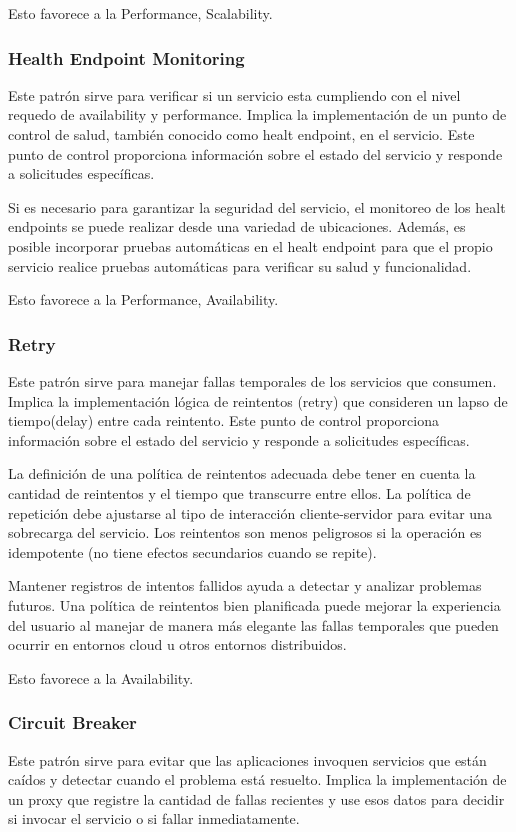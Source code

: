 \documentclass{article}
\begin{document}
		Esto favorece a la Performance, Scalability.
		
		\subsubsection{Health Endpoint Monitoring}
		Este patrón sirve para verificar si un servicio esta cumpliendo con el nivel requedo de availability y performance. Implica la implementación de un punto de control de salud, también conocido como healt endpoint, en el servicio. Este punto de control proporciona información sobre el estado del servicio y responde a solicitudes específicas.
		
		Si es necesario para garantizar la seguridad del servicio, el monitoreo de los healt endpoints se puede realizar desde una variedad de ubicaciones. Además, es posible incorporar pruebas automáticas en el healt endpoint para que el propio servicio realice pruebas automáticas para verificar su salud y funcionalidad.
		
		
		Esto favorece a la Performance, Availability.
		
		\subsubsection{Retry} \label{sec:retry}
		Este patrón sirve para manejar fallas temporales de los servicios que consumen. Implica la implementación lógica de reintentos (retry) que consideren un lapso de tiempo(delay) entre cada reintento. Este punto de control proporciona información sobre el estado del servicio y responde a solicitudes específicas.
		
		La definición de una política de reintentos adecuada debe tener en cuenta la cantidad de reintentos y el tiempo que transcurre entre ellos. La política de repetición debe ajustarse al tipo de interacción cliente-servidor para evitar una sobrecarga del servicio. Los reintentos son menos peligrosos si la operación es idempotente (no tiene efectos secundarios cuando se repite).
		
		Mantener registros de intentos fallidos ayuda a detectar y analizar problemas futuros. Una política de reintentos bien planificada puede mejorar la experiencia del usuario al manejar de manera más elegante las fallas temporales que pueden ocurrir en entornos cloud u otros entornos distribuidos.
		
		
		Esto favorece a la Availability.
		
		\subsubsection{Circuit Breaker}\label{sec:circuit_breaker}
		Este patrón sirve para evitar que las aplicaciones invoquen servicios que están caídos y detectar cuando el problema está resuelto. Implica la implementación de un proxy que registre la	cantidad de fallas recientes y use esos	datos para decidir si invocar el servicio o	si fallar inmediatamente.
		
\end{document}
